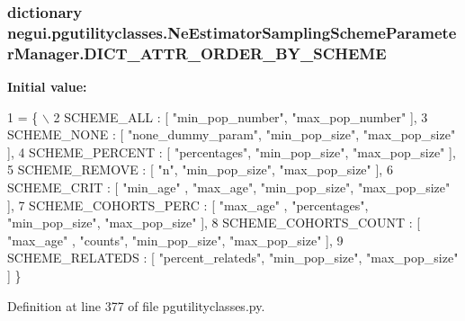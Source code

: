 \subsubsection[{\texorpdfstring{D\+I\+C\+T\+\_\+\+A\+T\+T\+R\+\_\+\+O\+R\+D\+E\+R\+\_\+\+B\+Y\+\_\+\+S\+C\+H\+E\+ME}{DICT_ATTR_ORDER_BY_SCHEME}}]{\setlength{\rightskip}{0pt plus 5cm}dictionary negui.\+pgutilityclasses.\+Ne\+Estimator\+Sampling\+Scheme\+Parameter\+Manager.\+D\+I\+C\+T\+\_\+\+A\+T\+T\+R\+\_\+\+O\+R\+D\+E\+R\+\_\+\+B\+Y\+\_\+\+S\+C\+H\+E\+ME\hspace{0.3cm}{\ttfamily [static]}}\hypertarget{classnegui_1_1pgutilityclasses_1_1NeEstimatorSamplingSchemeParameterManager_a76e4d0fce169bea78d1a7c8245c92264}{}\label{classnegui_1_1pgutilityclasses_1_1NeEstimatorSamplingSchemeParameterManager_a76e4d0fce169bea78d1a7c8245c92264}
{\bfseries Initial value\+:}
\begin{DoxyCode}
1 = \{ \(\backslash\)
2                 SCHEME\_ALL : [ \textcolor{stringliteral}{"min\_pop\_number"}, \textcolor{stringliteral}{"max\_pop\_number"} ],
3                 SCHEME\_NONE : [ \textcolor{stringliteral}{"none\_dummy\_param"}, \textcolor{stringliteral}{"min\_pop\_size"}, \textcolor{stringliteral}{"max\_pop\_size"} ],
4                 SCHEME\_PERCENT : [ \textcolor{stringliteral}{"percentages"}, \textcolor{stringliteral}{"min\_pop\_size"}, \textcolor{stringliteral}{"max\_pop\_size"}  ],
5                 SCHEME\_REMOVE : [ \textcolor{stringliteral}{"n"}, \textcolor{stringliteral}{"min\_pop\_size"}, \textcolor{stringliteral}{"max\_pop\_size"}  ],
6                 SCHEME\_CRIT : [ \textcolor{stringliteral}{"min\_age"} , \textcolor{stringliteral}{"max\_age"}, \textcolor{stringliteral}{"min\_pop\_size"}, \textcolor{stringliteral}{"max\_pop\_size"} ],
7                 SCHEME\_COHORTS\_PERC : [ \textcolor{stringliteral}{"max\_age"} , \textcolor{stringliteral}{"percentages"}, \textcolor{stringliteral}{"min\_pop\_size"}, \textcolor{stringliteral}{"max\_pop\_size"} ],
8                 SCHEME\_COHORTS\_COUNT : [ \textcolor{stringliteral}{"max\_age"} , \textcolor{stringliteral}{"counts"}, \textcolor{stringliteral}{"min\_pop\_size"}, \textcolor{stringliteral}{"max\_pop\_size"} ],
9                 SCHEME\_RELATEDS : [ \textcolor{stringliteral}{"percent\_relateds"}, \textcolor{stringliteral}{"min\_pop\_size"},  \textcolor{stringliteral}{"max\_pop\_size"} ] \}
\end{DoxyCode}


Definition at line 377 of file pgutilityclasses.\+py.

